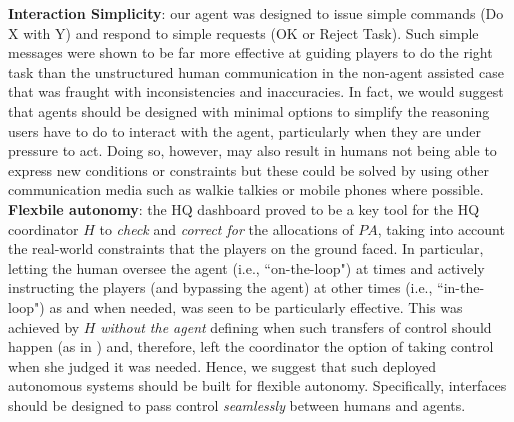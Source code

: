 \noindent \textbf{Interaction Simplicity}: our agent was designed to issue simple commands (Do X with Y) and respond to simple requests (OK or Reject Task). Such simple messages were shown to be far more effective at guiding players to do the right task than the unstructured human communication in the non-agent assisted case that was fraught with inconsistencies and inaccuracies. In fact, we would suggest that agents should be designed with minimal options to simplify the reasoning users have to do to interact with the agent, particularly when they are under pressure to act.  Doing so, however, may also result in humans not being able to express new conditions or constraints but these could be solved by using other communication media such as walkie talkies or mobile phones where possible.\\

\noindent \textbf{Flexbile autonomy}: the HQ dashboard proved to be a key tool for the HQ coordinator $H$ to \emph{check} and \emph{correct for} the allocations of $PA$, taking into account the real-world constraints that the players on the ground faced. In particular, letting the human oversee the agent (i.e., ``on-the-loop") at times and actively instructing  the players (and bypassing the agent) at other times (i.e., ``in-the-loop") as and when needed, was seen to be particularly effective. This was achieved by $H$ \emph{without the agent} defining when such transfers of control should happen (as in \cite{scerri:etal:2005}) and, therefore, left the coordinator the option of taking control when she judged it was needed. Hence, we suggest that such deployed autonomous systems should be built for flexible autonomy. Specifically, interfaces should be designed to pass control \emph{seamlessly} between humans and agents.



